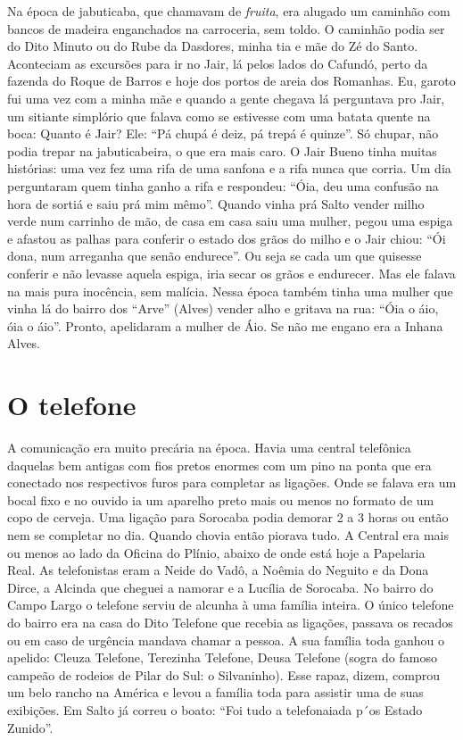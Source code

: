 \documentclass[12pt,brazil,]{book}
\begin{document}
Na época de jabuticaba, que chamavam de \emph{fruita}, era alugado um
caminhão com bancos de madeira enganchados na carroceria, sem toldo. O
caminhão podia ser do Dito Minuto ou do Rube da Dasdores, minha tia e
mãe do Zé do Santo. Aconteciam as excursões para ir no Jair, lá pelos
lados do Cafundó, perto da fazenda do Roque de Barros e hoje dos portos
de areia dos Romanhas. Eu, garoto fui uma vez com a minha mãe e quando a
gente chegava lá perguntava pro Jair, um sitiante simplório que falava
como se estivesse com uma batata quente na boca: Quanto é Jair? Ele:
``Pá chupá é deiz, pá trepá é quinze''. Só chupar, não podia trepar na
jabuticabeira, o que era mais caro. O Jair Bueno tinha muitas histórias:
uma vez fez uma rifa de uma sanfona e a rifa nunca que corria. Um dia
perguntaram quem tinha ganho a rifa e respondeu: ``Óia, deu uma confusão
na hora de sortiá e saiu prá mim mêmo''. Quando vinha prá Salto vender
milho verde num carrinho de mão, de casa em casa saiu uma mulher, pegou
uma espiga e afastou as palhas para conferir o estado dos grãos do milho
e o Jair chiou: ``Ói dona, num arreganha que senão endurece''. Ou seja
se cada um que quisesse conferir e não levasse aquela espiga, iria secar
os grãos e endurecer. Mas ele falava na mais pura inocência, sem
malícia. Nessa época também tinha uma mulher que vinha lá do bairro dos
``Arve'' (Alves) vender alho e gritava na rua: ``Óia o áio, óia o áio''.
Pronto, apelidaram a mulher de Áio. Se não me engano era a Inhana Alves.

\section{O telefone}\label{o-telefone}

A comunicação era muito precária na época. Havia uma central telefônica
daquelas bem antigas com fios pretos enormes com um pino na ponta que
era conectado nos respectivos furos para completar as ligações. Onde se
falava era um bocal fixo e no ouvido ia um aparelho preto mais ou menos
no formato de um copo de cerveja. Uma ligação para Sorocaba podia
demorar 2 a 3 horas ou então nem se completar no dia. Quando chovia
então piorava tudo. A Central era mais ou menos ao lado da Oficina do
Plínio, abaixo de onde está hoje a Papelaria Real. As telefonistas eram
a Neide do Vadô, a Noêmia do Neguito e da Dona Dirce, a Alcinda que
cheguei a namorar e a Lucília de Sorocaba. No bairro do Campo Largo o
telefone serviu de alcunha à uma família inteira. O único telefone do
bairro era na casa do Dito Telefone que recebia as ligações, passava os
recados ou em caso de urgência mandava chamar a pessoa. A sua família
toda ganhou o apelido: Cleuza Telefone, Terezinha Telefone, Deusa
Telefone (sogra do famoso campeão de rodeios de Pilar do Sul: o
Silvaninho). Esse rapaz, dizem, comprou um belo rancho na América e
levou a família toda para assistir uma de suas exibições. Em Salto já
correu o boato: ``Foi tudo a telefonaiada p´os Estado Zunido''.
\end{document}

